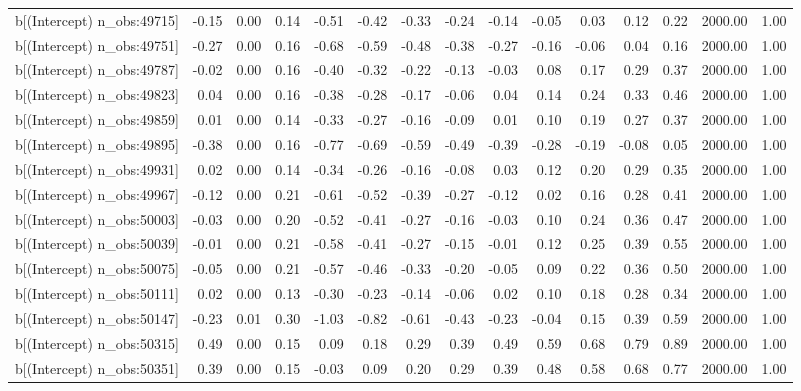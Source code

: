 \begin{table}[ht]
\begin{tabular}{rrrrrrrrrrrrrrr}
  b[(Intercept) n\_obs:49715] & -0.15 & 0.00 & 0.14 & -0.51 & -0.42 & -0.33 & -0.24 & -0.14 & -0.05 & 0.03 & 0.12 & 0.22 & 2000.00 & 1.00 \\ 
  b[(Intercept) n\_obs:49751] & -0.27 & 0.00 & 0.16 & -0.68 & -0.59 & -0.48 & -0.38 & -0.27 & -0.16 & -0.06 & 0.04 & 0.16 & 2000.00 & 1.00 \\ 
  b[(Intercept) n\_obs:49787] & -0.02 & 0.00 & 0.16 & -0.40 & -0.32 & -0.22 & -0.13 & -0.03 & 0.08 & 0.17 & 0.29 & 0.37 & 2000.00 & 1.00 \\ 
  b[(Intercept) n\_obs:49823] & 0.04 & 0.00 & 0.16 & -0.38 & -0.28 & -0.17 & -0.06 & 0.04 & 0.14 & 0.24 & 0.33 & 0.46 & 2000.00 & 1.00 \\ 
  b[(Intercept) n\_obs:49859] & 0.01 & 0.00 & 0.14 & -0.33 & -0.27 & -0.16 & -0.09 & 0.01 & 0.10 & 0.19 & 0.27 & 0.37 & 2000.00 & 1.00 \\ 
  b[(Intercept) n\_obs:49895] & -0.38 & 0.00 & 0.16 & -0.77 & -0.69 & -0.59 & -0.49 & -0.39 & -0.28 & -0.19 & -0.08 & 0.05 & 2000.00 & 1.00 \\ 
  b[(Intercept) n\_obs:49931] & 0.02 & 0.00 & 0.14 & -0.34 & -0.26 & -0.16 & -0.08 & 0.03 & 0.12 & 0.20 & 0.29 & 0.35 & 2000.00 & 1.00 \\ 
  b[(Intercept) n\_obs:49967] & -0.12 & 0.00 & 0.21 & -0.61 & -0.52 & -0.39 & -0.27 & -0.12 & 0.02 & 0.16 & 0.28 & 0.41 & 2000.00 & 1.00 \\ 
  b[(Intercept) n\_obs:50003] & -0.03 & 0.00 & 0.20 & -0.52 & -0.41 & -0.27 & -0.16 & -0.03 & 0.10 & 0.24 & 0.36 & 0.47 & 2000.00 & 1.00 \\ 
  b[(Intercept) n\_obs:50039] & -0.01 & 0.00 & 0.21 & -0.58 & -0.41 & -0.27 & -0.15 & -0.01 & 0.12 & 0.25 & 0.39 & 0.55 & 2000.00 & 1.00 \\ 
  b[(Intercept) n\_obs:50075] & -0.05 & 0.00 & 0.21 & -0.57 & -0.46 & -0.33 & -0.20 & -0.05 & 0.09 & 0.22 & 0.36 & 0.50 & 2000.00 & 1.00 \\ 
  b[(Intercept) n\_obs:50111] & 0.02 & 0.00 & 0.13 & -0.30 & -0.23 & -0.14 & -0.06 & 0.02 & 0.10 & 0.18 & 0.28 & 0.34 & 2000.00 & 1.00 \\ 
  b[(Intercept) n\_obs:50147] & -0.23 & 0.01 & 0.30 & -1.03 & -0.82 & -0.61 & -0.43 & -0.23 & -0.04 & 0.15 & 0.39 & 0.59 & 2000.00 & 1.00 \\ 
  b[(Intercept) n\_obs:50315] & 0.49 & 0.00 & 0.15 & 0.09 & 0.18 & 0.29 & 0.39 & 0.49 & 0.59 & 0.68 & 0.79 & 0.89 & 2000.00 & 1.00 \\ 
  b[(Intercept) n\_obs:50351] & 0.39 & 0.00 & 0.15 & -0.03 & 0.09 & 0.20 & 0.29 & 0.39 & 0.48 & 0.58 & 0.68 & 0.77 & 2000.00 & 1.00 \\ 

\end{tabular}
\end{table}
